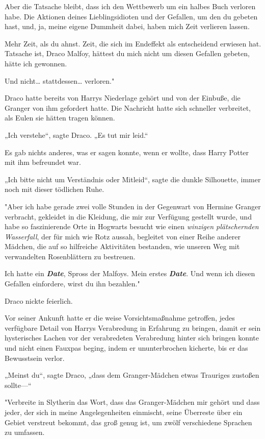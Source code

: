 {Aber die Tatsache bleibt, dass ich den Wettbewerb um ein halbes Buch verloren habe. Die Aktionen deines Lieblingsidioten und der Gefallen, um den du gebeten hast, und, ja, meine eigene Dummheit dabei, haben mich Zeit verlieren lassen.

Mehr Zeit, als du ahnst. Zeit, die sich im Endeffekt als entscheidend erwiesen hat. Tatsache ist, Draco Malfoy, hättest du mich nicht um diesen Gefallen gebeten, hätte ich gewonnen.

Und nicht… stattdessen… verloren."

Draco hatte bereits von Harrys Niederlage gehört und von der Einbuße, die Granger von ihm gefordert hatte. Die Nachricht hatte sich schneller verbreitet, als Eulen sie hätten tragen können.

„Ich verstehe“, sagte Draco. „Es tut mir leid.“

Es gab nichts anderes, was er sagen konnte, wenn er wollte, dass Harry Potter mit ihm befreundet war.

„Ich bitte nicht um Verständnis oder Mitleid“, sagte die dunkle Silhouette, immer noch mit dieser tödlichen Ruhe.

"Aber ich habe gerade zwei volle Stunden in der Gegenwart von Hermine Granger verbracht, gekleidet in die Kleidung, die mir zur Verfügung gestellt wurde, und habe so faszinierende Orte in Hogwarts besucht wie einen \emph{winzigen plätschernden Wasserfall}, der für mich wie Rotz aussah, begleitet von einer Reihe anderer Mädchen, die auf so hilfreiche Aktivitäten bestanden, wie unseren Weg mit verwandelten Rosenblättern zu bestreuen.

Ich hatte ein \textbf{\emph{Date}}, Spross der Malfoys. Mein erstes \textbf{\emph{Date}}. Und wenn ich diesen Gefallen einfordere, wirst du ihn bezahlen."

Draco nickte feierlich.

Vor seiner Ankunft hatte er die weise Vorsichtsmaßnahme getroffen, jedes verfügbare Detail von Harrys Verabredung in Erfahrung zu bringen, damit er sein hysterisches Lachen vor der verabredeten Verabredung hinter sich bringen konnte und nicht einen Fauxpas beging, indem er ununterbrochen kicherte, bis er das Bewusstsein verlor.

„Meinst du“, sagte Draco, „dass dem Granger-Mädchen etwas Trauriges zustoßen sollte—“

"Verbreite in Slytherin das Wort, dass das Granger-Mädchen mir gehört und dass jeder, der sich in meine Angelegenheiten einmischt, seine Überreste über ein Gebiet verstreut bekommt, das groß genug ist, um zwölf verschiedene Sprachen zu umfassen.

}
